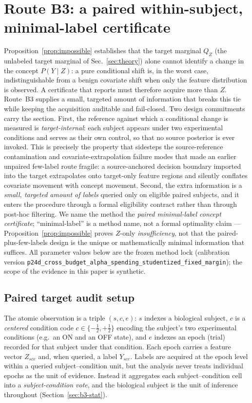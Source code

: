 \section{Route B3: a paired within-subject, minimal-label certificate}
\label{sec:routeB3method}

Proposition~\ref{prop:impossible} establishes that the target marginal $Q_Z$ (the unlabeled target
marginal of Sec.~\ref{sec:theory}) alone cannot identify a
change in the concept $P(Y\mid Z)$: a pure conditional shift is, in the worst case, indistinguishable from
a benign covariate shift when only the feature distribution is observed. A certificate that reports
\stconf{} must therefore acquire more than $Z$. Route~B3 supplies a small, targeted amount of information
that breaks this tie while keeping the acquisition auditable and fail-closed. Two design commitments carry
the section. First, the reference against which a conditional change is measured is \emph{target-internal}:
each subject appears under two experimental conditions and serves as their own control, so that no source
posterior is ever invoked. This is precisely the property that sidesteps the source-reference contamination
and covariate-extrapolation failure modes that made an earlier unpaired few-label route fragile: a
source-anchored decision boundary imported into the target extrapolates onto target-only feature regions and
silently conflates covariate movement with concept movement. Second, the extra information is a
\emph{small, targeted amount of labels} queried only on eligible paired subjects, and it enters the
procedure through a formal eligibility contract rather than through post-hoc filtering.
We name the method the \emph{paired minimal-label concept certificate}; ``minimal-label'' is a method name,
not a formal optimality claim --- Proposition~\ref{prop:impossible} proves $Z$-only \emph{insufficiency}, not
that the paired-plus-few-labels design is the unique or mathematically minimal information that suffices.
All parameter values below are the frozen method lock
(calibration version \texttt{p24d\_cross\_budget\_alpha\_spending\_studentized\_fixed\_margin}); the scope of
the evidence in this paper is synthetic.

\subsection{Paired target audit setup}
\label{sec:b3-setup}
The atomic observation is a triple $(s,c,e)$: $s$ indexes a biological subject, $c$ is a \emph{centered}
condition code $c\in\{-\tfrac12,+\tfrac12\}$ encoding the subject's two experimental conditions (e.g.\ an
ON and an OFF state), and $e$ indexes an epoch (trial) recorded for that subject under that condition. Each
epoch carries a feature vector $Z_{sce}$ and, when queried, a label $Y_{sce}$. Labels are acquired at the
epoch level within a queried subject--condition unit, but the analysis never treats individual epochs as the
unit of evidence. Instead it aggregates each subject--condition cell into a \emph{subject-condition vote},
and the biological subject is the unit of inference throughout (Section~\ref{sec:b3-stat}).


